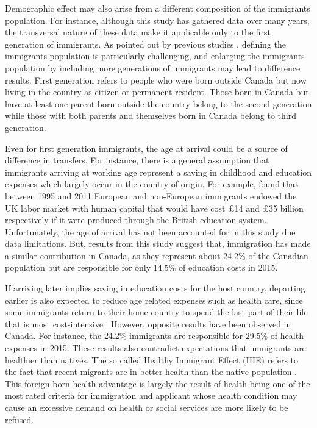 \vspace{0.7em}\par
Demographic effect may also arise from a different composition of the immigrants population.
For instance, although this study has gathered data over many years, the transversal nature of these data make it applicable only to the first generation of immigrants.
As pointed out by previous studies \citep{Lee:1998fs}, defining the immigrants population is particularly challenging, and enlarging the immigrants population by including more generations of immigrants may lead to difference results.
First generation refers to people who were born outside Canada but now living in the country as citizen or permanent resident.
Those born in Canada but have at least one parent born outside the country belong to the second generation while those with both parents and themselves born in Canada belong to third generation.

\vspace{0.7em}\par
Even for first generation immigrants, the age at arrival could be a source of difference in transfers.
For instance, there is a general assumption that immigrants arriving at working age represent a saving in childhood and education expenses which largely occur in the country of origin.
For example, \citet{Dustmann:2014dr} found that between 1995 and 2011 European and non-European immigrants endowed the UK labor market with human capital that would have cost \pounds14 and \pounds35 billion respectively if it were produced through the British education system.
Unfortunately, the age of arrival has not been accounted for in this study due data limitations.
But, results from this study suggest that, immigration has made a similar contribution in Canada, as they represent about 24.2\% of the Canadian population but are responsible for only 14.5\% of education costs in 2015.


\vspace{0.7em}\par
If arriving later implies saving in education costs for the host country, departing earlier is also expected to reduce age related expenses such as health care, since some immigrants return to their home country to spend the last part of their life that is most cost-intensive \citep{Bratsberg:2014cl}.
However, opposite results have been observed in Canada.
For instance, the 24.2\% immigrants are responsible for 29.5\% of health expenses in 2015.
These results also contradict expectations that immigrants are healthier than natives.
The so called Healthy Immigrant Effect (HIE) refers to the fact that recent migrants are in better health than the native population \citep{Ichou:2019ik,Vang:2016di}.
This foreign-born health advantage is largely the result of health being one of the most rated criteria for immigration and applicant whose health condition may cause an excessive demand on health or social services are more likely to be refused.

